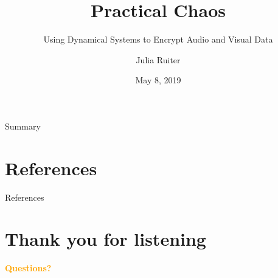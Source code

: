 \documentclass[aspectratio=43]{beamer}
\title{Practical Chaos} %
\subtitle{Using Dynamical Systems to Encrypt Audio and Visual Data}
\author[J. Ruiter]{Julia Ruiter}
\institute[Capstone Presentation]{
    Scripps College%
    \\%
    Department of Mathematics and Physics%
} %
\date{May 8, 2019}
\begin{document}
    
    \frame{\titlepage}
    
    \begin{frame}{Summary}
        \tableofcontents
    \end{frame}
    
    
    
    
    


    
    
    \section*{References}%
        \nocite{Strogatz} \nocite{Koblitz} \nocite{article} \nocite{PhysRevLett.64.821} \nocite{PhysRevLett.71.65} \nocite{MR1917690}  \nocite{MR1604666} \nocite{lorenz1963} \nocite{Nishi} \nocite{Cruz}
        \begin{frame}[allowframebreaks]{References}
            \printbibliography
        \end{frame}

    \section*{Thank you for listening}
    \begin{frame}{}
        \centering
            \Huge\bfseries
        \textcolor{orange}{Questions?}
    \end{frame}
\end{document}
